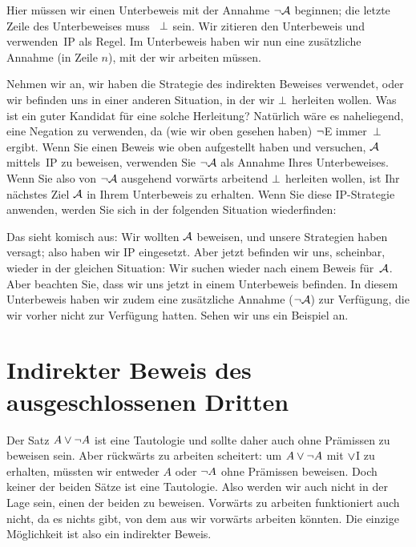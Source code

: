 \begin{fitchproof}
\open
{}
\ellipsesline 
{}
\close
{}
\end{fitchproof}
Hier müssen wir einen Unterbeweis mit der Annahme $\neg \mathcal{A}$ beginnen; die letzte Zeile des Unterbeweises muss ~$\bot$ sein. Wir zitieren den Unterbeweis und verwenden~IP als Regel. Im Unterbeweis haben wir nun eine zusätzliche Annahme (in Zeile $n$), mit der wir arbeiten müssen.

Nehmen wir an, wir haben die Strategie des indirekten Beweises verwendet, oder wir befinden uns in einer anderen Situation, in der wir $\bot$ herleiten wollen. Was ist ein guter Kandidat für eine solche Herleitung? Natürlich wäre es naheliegend, eine Negation zu verwenden, da (wie wir oben gesehen haben) $\neg$E immer~$\bot$ ergibt. Wenn Sie einen Beweis wie oben aufgestellt haben und versuchen, $\mathcal{A}$ mittels~IP zu beweisen, verwenden Sie $\neg \mathcal{A}$ als Annahme Ihres Unterbeweises. Wenn Sie also von $\neg \mathcal{A}$ ausgehend vorwärts arbeitend $\bot$ herleiten wollen, ist Ihr nächstes Ziel $\mathcal{A}$ in Ihrem Unterbeweis zu erhalten. Wenn Sie diese IP-Strategie anwenden, werden Sie sich in der folgenden Situation wiederfinden: 
\begin{fitchproof}
\open
{}
\ellipsesline
{}
\close
{}
\end{fitchproof} 
Das sieht komisch aus: Wir wollten $\mathcal{A}$ beweisen, und unsere Strategien haben versagt; also haben wir IP eingesetzt. Aber jetzt befinden wir uns, scheinbar, wieder in der gleichen Situation: Wir suchen wieder nach einem Beweis für~$\mathcal{A}$. Aber beachten Sie, dass wir uns jetzt in einem Unterbeweis befinden. In diesem Unterbeweis haben wir zudem eine zusätzliche Annahme ($\neg \mathcal{A}$) zur Verfügung, die wir vorher nicht zur Verfügung hatten. Sehen wir uns ein Beispiel an.

\section{Indirekter Beweis des ausgeschlossenen Dritten}\label{s:proofLEM}

Der Satz $A \vee \neg A$ ist eine Tautologie und sollte daher auch ohne Prämissen zu beweisen sein. Aber rückwärts zu arbeiten scheitert: um $A \vee \neg A$ mit $\vee$I zu erhalten, müssten wir entweder $A$ oder $\neg A$ ohne Prämissen beweisen. Doch keiner der beiden Sätze ist eine Tautologie. Also werden wir auch nicht in der Lage sein, einen der beiden zu beweisen. Vorwärts zu arbeiten funktioniert auch nicht, da es nichts gibt, von dem aus wir vorwärts arbeiten könnten. Die einzige Möglichkeit ist also ein indirekter Beweis.

